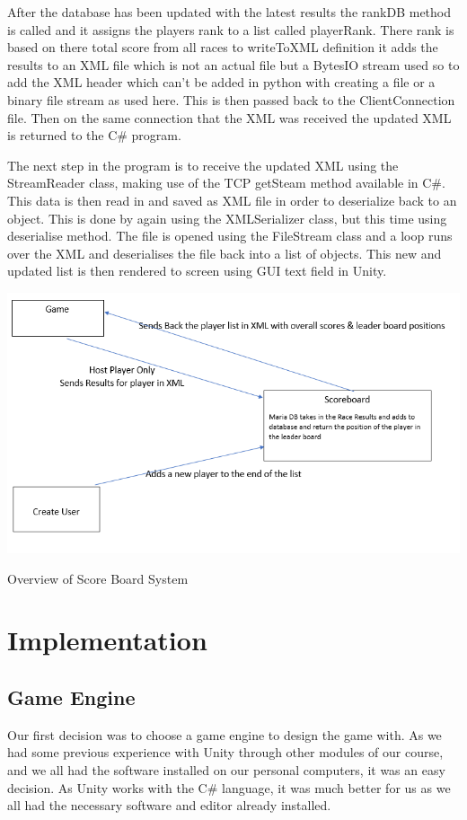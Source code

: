 After the database has been updated with the latest results the rankDB method is called and it assigns the players rank to a list called playerRank. There rank is based on there total score from all races to writeToXML  definition it adds the results to an XML file which is not an actual file but a BytesIO stream used so to add the XML header which can't be added in python with creating a file or a binary file stream as used here. This is then passed back to the ClientConnection file. Then on the same connection that the XML was received the updated XML is returned to the C# program.    
\newline

The next step in the program is to receive the updated XML using the StreamReader class, making use of the TCP getSteam method available in C#. This data is then read in and saved as XML file in order to deserialize back to an object. This is done by again using the XMLSerializer class, but this time using deserialise method. The file is opened using the FileStream class and a loop runs over the XML and deserialises the file back into a list of objects. This new and updated list is then rendered to screen using GUI text field in Unity.
\newline

\includegraphics[width=1\columnwidth]{img/scoreBoard.PNG}

Overview of Score Board System

\newpage
\section{Implementation}


\subsection{Game Engine}
Our first decision was to choose a game engine to design the game with. As we had some previous experience with Unity through other modules of our course, and we all had the software installed on our personal computers, it was an easy decision. As Unity works with the C# language, it was much better for us as we all had the necessary software and editor already installed.  
